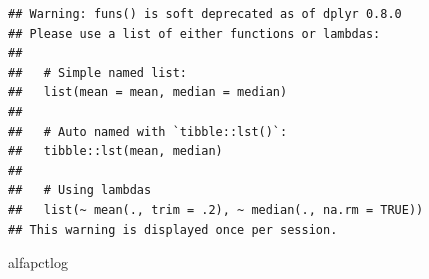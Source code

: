 \documentclass[11pt,]{article}
\newenvironment{Shaded}{\begin{snugshade}}{\end{snugshade}}
\newcommand{\KeywordTok}[1]{\textcolor[rgb]{0.13,0.29,0.53}{\textbf{#1}}}
\newcommand{\DataTypeTok}[1]{\textcolor[rgb]{0.13,0.29,0.53}{#1}}
\newcommand{\DecValTok}[1]{\textcolor[rgb]{0.00,0.00,0.81}{#1}}
\newcommand{\StringTok}[1]{\textcolor[rgb]{0.31,0.60,0.02}{#1}}
\newcommand{\OperatorTok}[1]{\textcolor[rgb]{0.81,0.36,0.00}{\textbf{#1}}}
\newcommand{\NormalTok}[1]{#1}
\begin{document}
\begin{Shaded}
\end{Shaded}

\begin{verbatim}
## Warning: funs() is soft deprecated as of dplyr 0.8.0
## Please use a list of either functions or lambdas: 
## 
##   # Simple named list: 
##   list(mean = mean, median = median)
## 
##   # Auto named with `tibble::lst()`: 
##   tibble::lst(mean, median)
## 
##   # Using lambdas
##   list(~ mean(., trim = .2), ~ median(., na.rm = TRUE))
## This warning is displayed once per session.
\end{verbatim}

\begin{Shaded}
\begin{Highlighting}[]
\NormalTok{alfapctlog}
\end{Highlighting}
\end{Shaded}
\end{document}
